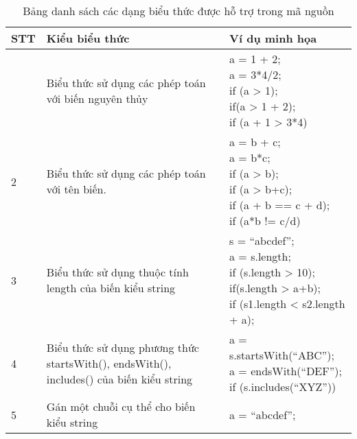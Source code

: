 \setlength\LTleft{0pt}
\setlength\LTright{0pt}
\begin{longtable}{ |p{1cm}|p{7cm}|p{}|}
    \caption{Bảng danh sách các dạng biểu thức được hỗ trợ trong mã nguồn}
    \\
         \hline
         \textbf{STT} & \textbf{Kiểu biểu thức} & \textbf{Ví dụ minh họa}\\
         \hline
         \endhead
         \hline
         \endfoot
        1 & Biểu thức sử dụng các phép toán với biến nguyên thủy & \makecell[l]{ a = 1 + 2;\\
         a = 3*4/2;\\
        if (a > 1);\\ if(a > 1 + 2); \\
        if (a + 1 > 3*4)} 
        \\
        \hline
        2 & Biểu thức sử dụng các phép toán với tên biến.   & \makecell[l]{ a = b + c;\\ a = b*c;\\
        if (a > b); \\if (a > b+c); \\
        if (a + b ==  c + d); \\
        if (a*b != c/d)}
        \\
        \hline
        3 & Biểu thức sử dụng thuộc tính length của biến kiểu string & \makecell[l]{ s = “abcdef”;\\
        a = s.length;\\
        if (s.length > 10);\\
        if(s.length > a+b); \\
        if (s1.length < s2.length + a);}
        \\
        \hline
        4 & Biểu thức sử dụng phương thức startsWith(), endsWith(), includes() của biến kiểu string & \makecell[l]{ a = s.startsWith(“ABC”); \\
        a = endsWith(“DEF”);\\
        if (s.includes(“XYZ”))}
        \\
        \hline
        5 & Gán một chuỗi cụ thể cho biến kiểu string & a = “abcdef”;\\

\end{longtable}
